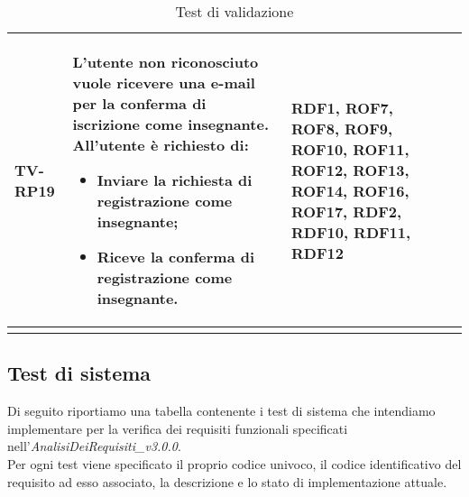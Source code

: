\begin{longtable}{|>{\centering\arraybackslash}m{1.6cm}|>{\centering\arraybackslash}m{6.41cm}|>{\centering\arraybackslash}m{3.1cm} | >{\centering\arraybackslash}m{2.6cm}|}
		  \rowcolor{LightGray}
TV-RP19 & L’utente non riconosciuto vuole ricevere una e-mail per la conferma di iscrizione come insegnante. All'utente è richiesto di:

\begin{itemize}
 \item Inviare la richiesta di registrazione come insegnante;
 \item Riceve la conferma di registrazione come insegnante.
\end{itemize}  & RDF1, ROF7, ROF8, ROF9, ROF10, ROF11, ROF12, ROF13, ROF14, ROF16, ROF17, RDF2, RDF10, RDF11, RDF12 \\ \hline

		\caption{Test di validazione}
\end{longtable}

\subsection{Test di sistema}
Di seguito riportiamo una tabella contenente i test di sistema che intendiamo implementare per la verifica dei requisiti funzionali specificati nell'\textit{AnalisiDeiRequisiti\_v3.0.0}. \\
Per ogni test viene specificato il proprio codice univoco, il codice identificativo del requisito ad esso associato, la descrizione e lo stato di implementazione attuale.

